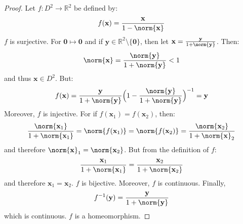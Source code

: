             \begin{proof}
                Let $f:D^{2}\rightarrow\mathbb{R}^{2}$
                be defined by:
                \begin{equation}
                    f(\mathbf{x})=\frac{\mathbf{x}}{1-\norm{\mathbf{x}}}
                \end{equation}
                $f$ is surjective. For $\mathbf{0}\mapsto\mathbf{0}$ and if
                $\mathbf{y}\in\mathbb{R}^2\setminus\{\mathbf{0}\}$, then let
                $\mathbf{x}=\frac{\mathbf{y}}{1+\norm{\mathbf{y}}}$. Then:
                \begin{equation}
                    \norm{\mathbf{x}}
                    =\frac{\norm{\mathbf{y}}}{1+\norm{\mathbf{y}}}<1
                \end{equation}
                and thus $\mathbf{x}\in D^{2}$. But:
                \begin{equation}
                    f(\mathbf{x})
                    =\frac{\mathbf{y}}{1+\norm{\mathbf{y}}}
                    \Big(
                        1-\frac{\norm{\mathbf{y}}}{1+\norm{\mathbf{y}}}
                    \Big)^{-1}
                    =\mathbf{y}
                \end{equation}
                Moreover, $f$ is injective.
                For if
                $f(\mathbf{x}_{1})=f(\mathbf{x}_{2})$,
                then:
                \begin{equation}
                    \frac{\norm{\mathbf{x}_{1}}}{1+\norm{\mathbf{x}_{1}}}
                    =\norm{f(\mathbf{x}_{1})}
                    =\norm{f(\mathbf{x}_{2})}
                    =\frac{\norm{\mathbf{x}_{2}}}{1+\norm{\mathbf{x}}_{2}}
                \end{equation}
                and therefore
                $\norm{\mathbf{x}}_{1}=\norm{\mathbf{x}_{2}}$.
                But from the definition of $f$:
                \begin{equation}
                    \frac{\mathbf{x}_{1}}{1+\norm{\mathbf{x}_{1}}}
                    =\frac{\mathbf{x}_{2}}{1+\norm{\mathbf{x}_{2}}}
                \end{equation}
                and therefore $\mathbf{x}_{1}=\mathbf{x}_{2}$.
                $f$ is bijective.
                Moreover, $f$ is continuous. Finally,
                \begin{equation}
                    f^{-1}(\mathbf{y})
                    =\frac{\mathbf{y}}{1+\norm{\mathbf{y}}}                    
                \end{equation}
                which is continuous. $f$ is a homeomorphism.
            \end{proof}
